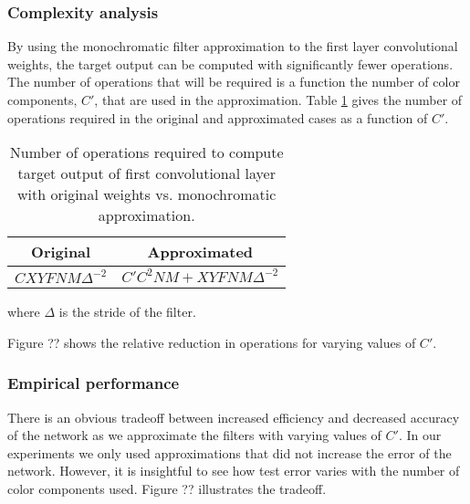 \subsubsection{Complexity analysis}
By using the monochromatic filter approximation to the first layer convolutional weights, the target output can be computed with significantly fewer operations. The number of operations that will be required is a function the number of color components, $C'$, that are used in the approximation. Table \ref{monochromatic_ops} gives the number of operations required in the original and approximated cases as a function of $C'$. 

\begin{table}[h]
\tiny
\parbox{\linewidth}{
\centering
\begin{tabular}{cc}
\hline
Original & Approximated \\
\hline
$C X Y F N M \Delta^{-2}$  & $	 C' C^2 N M + X Y F N M \Delta^{-2}$\\
\hline
\end{tabular}
\caption{Number of operations required to compute target output of first convolutional layer with original weights vs. monochromatic approximation.}
\label{monochromatic_ops}
}
\end{table}
where $\Delta$ is the stride of the filter.

Figure ?? shows the relative reduction in operations for varying values of $C'$.

\subsubsection{Empirical performance}
There is an obvious tradeoff between increased efficiency and decreased accuracy of the network as we approximate the filters with varying values of $C'$. In our experiments we only used approximations that did not increase the error of the network. However, it is insightful to see how test error varies with the number of color components used. Figure ?? illustrates the tradeoff.

